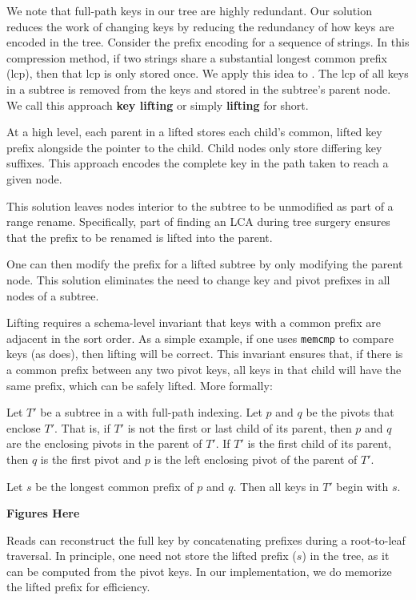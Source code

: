 We note that full-path keys in our tree are highly redundant.
Our solution
reduces the work of changing keys by reducing the redundancy of how
keys are encoded in the tree.
Consider the prefix encoding for a sequence
of strings.  In this compression method, if two strings share a
substantial longest common prefix (lcp), then that lcp is only stored
once.  We apply this idea to \bets. %
The lcp of all keys in a subtree is removed from the keys and stored in the
subtree's parent node.
We call this approach \textbf{key lifting} or
simply \textbf{lifting} for short.

At a high level, each parent in a lifted \bet stores
each child's common, lifted key prefix alongside the pointer to the child.
Child nodes only store differing key suffixes.
This approach encodes the complete key in the path taken to reach a given node.

This solution leaves nodes interior to the subtree to be unmodified as part of a range rename.
Specifically, part of finding an LCA during tree surgery ensures that the prefix to be renamed
is lifted into the parent.

One can then modify the prefix for a lifted subtree by only modifying the
parent node.
This solution
eliminates the need to change key and pivot prefixes in all nodes of a subtree.

Lifting requires a schema-level invariant that keys with a common prefix are adjacent
in the sort order.  As a simple example, if one uses {\tt memcmp} to compare keys (as \betrfs does),
then lifting will be correct.  This invariant ensures that, if there is a common prefix between any two pivot keys,
all keys in that child will have the same prefix, which can be safely lifted.
More formally:
\begin{invariant}
Let $T'$ be a subtree in a \bet with full-path indexing.  Let $p$ and
$q$ be the pivots that enclose $T'$.  That is, if $T'$ is not the first
or last child of its parent, then $p$ and $q$ are the enclosing pivots
in the parent of $T'$.  If $T'$ is the first child of its parent, then
$q$ is the first pivot and $p$ is the left enclosing pivot of the parent of $T'$.

Let $s$ be the longest common prefix of $p$ and $q$.  Then all keys
in $T'$ begin with $s$.
\end{invariant}

\textbf{Figures Here}

Reads can reconstruct the full key by concatenating prefixes during a
root-to-leaf traversal.  In principle, one need not store the lifted prefix ($s$)
in the tree, as it can be computed from the pivot keys.
In our implementation, we do memorize the lifted prefix for efficiency.


